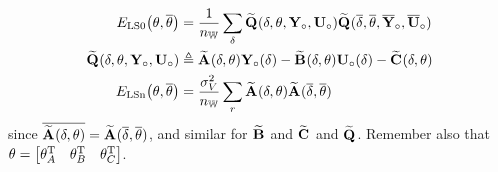 \begin{align}
   \ELSCost[0]{\theta,\conj{\theta}} & =
      \frac{1}{\nWind}
           \sum_{\dW}
           \LocalModel{Q}(      \dW,        \LocalVector{\theta},  \true{      \LocalVector{Y}},  \true{      \LocalVector{U} })
           \LocalModel{Q}(\conj{\dW}, \conj{\LocalVector{\theta}}, \true{\conj{\LocalVector{Y}}}, \true{\conj{\LocalVector{U}}})
   \\
   \LocalModel{Q}(\dW, \LocalVector{\theta},  \true{\LocalVector{Y}},  \true{ \LocalVector{U} }) & \isdef
                 \LocalModel{A}(\dW, \LocalVector{\theta}) \true{\LocalVector{Y}}(\dW)
               - \LocalModel{B}(\dW, \LocalVector{\theta}) \true{\LocalVector{U}}(\dW)
               - \LocalModel{C}(\dW, \LocalVector{\theta})
    \\             
    \ELSCost[n]{\theta,\conj{\theta}} & =
              \frac{\sigma_V^2}{\nWind} 
                     \sum_{r} 
                               \LocalModel{A}(      \dW,        \LocalVector{\theta} ) 
                               \LocalModel{A}(\conj{\dW}, \conj{\LocalVector{\theta}}) 
\end{align}
since $\conj{ \LocalModel{A}(\dW,\theta)} =  \LocalModel{A}(\conj{\dW},\conj{\theta}) $, and similar for $\LocalModel{B}$ and $\LocalModel{C}$ and $\LocalModel{Q}$.
Remember also that $\theta = \mat{\theta_A^{\TT} & \theta_B^{\TT} & \theta_C^{\TT}}$.

